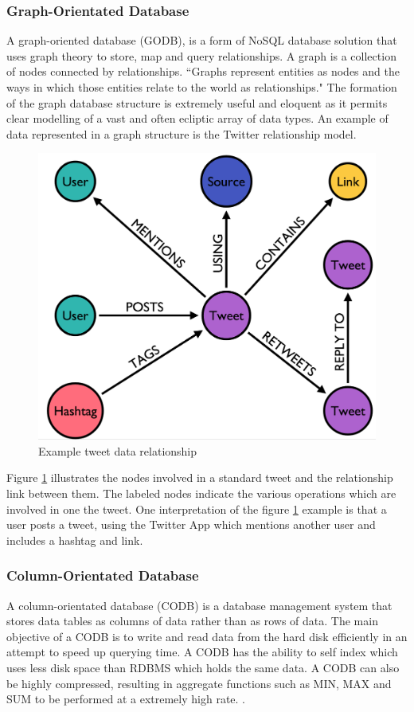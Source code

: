 \subsubsection{Graph-Orientated Database}
A graph-oriented database (GODB), is a form of NoSQL database solution that uses graph theory to store, map and query relationships. A graph is a collection of nodes connected by relationships. ``Graphs represent entities as nodes and the ways in which those entities relate to the world as relationships."  \cite{gd} The formation of the graph database structure is extremely useful and eloquent as it permits clear modelling of a vast and often ecliptic array of data types.  \cite{gd} An example of data represented in a graph structure is the Twitter relationship model. \begin{figure}[h]\begin{center}\includegraphics[width=0.5\linewidth]{images/graphdb_twitter}\caption{Example tweet data relationship}\label{fig:twitter}\end{center}\end{figure} Figure \ref{fig:twitter} illustrates the nodes involved in a standard tweet and the relationship link between them. The labeled nodes indicate the various operations which are involved in one the tweet. One interpretation of the figure \ref{fig:twitter} example is that a user posts a tweet, using the Twitter App which mentions another user and includes a hashtag and link.

\subsubsection{Column-Orientated Database}
A column-orientated database (CODB) is a database management system that stores data tables as columns of data rather than as rows of data. The main objective of a CODB is to write and read data from the hard disk efficiently in an attempt to speed up querying time. A CODB has the ability to self index which uses less disk space than RDBMS which holds the same data. A CODB can also be highly compressed, resulting in aggregate functions such as MIN, MAX and SUM to be performed at a extremely high rate. \cite{cd}.

